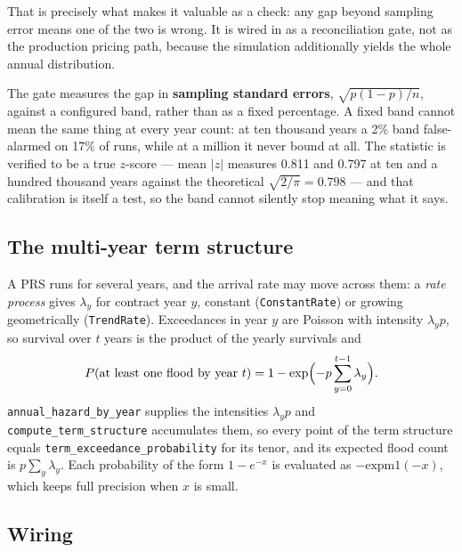 \documentclass[11pt]{article}
\begin{document}
That is precisely what makes it valuable as a check: any gap beyond sampling
error means one of the two is wrong. It is wired in as a reconciliation gate,
not as the production pricing path, because the simulation additionally yields
the whole annual distribution.

The gate measures the gap in \textbf{sampling standard errors},
$\sqrt{p(1-p)/n}$, against a configured band, rather than as a fixed
percentage. A fixed band cannot mean the same thing at every year count: at ten
thousand years a 2\% band false-alarmed on 17\% of runs, while at a million it
never bound at all. The statistic is verified to be a true $z$-score --- mean
$|z|$ measures 0.811 and 0.797 at ten and a hundred thousand years against the
theoretical $\sqrt{2/\pi} = 0.798$ --- and that calibration is itself a test, so
the band cannot silently stop meaning what it says.

\subsection{The multi-year term structure}
\label{sec:termstructure}

A PRS runs for several years, and the arrival rate may move across them: a
\emph{rate process} gives $\lambda_y$ for contract year $y$, constant
(\texttt{ConstantRate}) or growing geometrically (\texttt{TrendRate}). Exceedances
in year $y$ are Poisson with intensity $\lambda_y p$, so survival over $t$ years is
the product of the yearly survivals and
\begin{equation}
P(\text{at least one flood by year } t) = 1 - \exp\Bigl(-p\sum_{y=0}^{t-1}\lambda_y\Bigr).
\end{equation}
\texttt{annual\_hazard\_by\_year} supplies the intensities $\lambda_y p$ and
\texttt{compute\_term\_structure} accumulates them, so every point of the term
structure equals \texttt{term\_exceedance\_probability} for its tenor, and its
expected flood count is $p\sum_y\lambda_y$. Each probability of the form
$1-e^{-x}$ is evaluated as $-\mathrm{expm1}(-x)$, which keeps full precision when
$x$ is small.

\subsection{Wiring}
\end{document}
